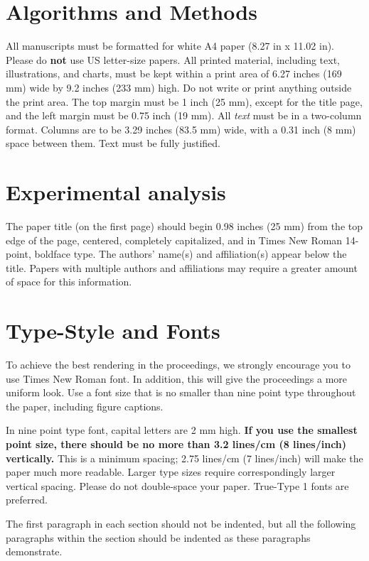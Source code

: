 \documentclass[a4paper,10pt,oneside]{article}
\begin{document}
\begin{sloppy}
\section{ Algorithms and Methods }
\label{sec:format}

All manuscripts must be formatted for white A4 paper (8.27 in x 11.02 in). Please do \textbf{not} use US letter-size papers. All printed material, including text, illustrations, and charts, must be kept within a print area of 6.27 inches (169 mm) wide by 9.2 inches (233 mm) high. Do not write or print anything outside the print area. The top margin must be 1 inch (25 mm), except for the title page, and the left margin must be 0.75 inch (19 mm). All \textit{text} must be in a two-column format. Columns are to be 3.29 inches (83.5 mm) wide, with a 0.31 inch (8 mm) space between them. Text must be fully justified.

\section{ Experimental analysis }
\label{sec:pagestyle}

The paper title (on the first page) should begin 0.98 inches (25 mm) from the top edge of the page, centered, completely capitalized, and in Times New Roman 14-point, boldface type. The authors' name(s) and affiliation(s) appear below the title. Papers with multiple authors and affiliations may require a greater amount of space for this information.

\section{Type-Style and Fonts}
\label{sec:typestyle}

To achieve the best rendering in the proceedings, we strongly encourage you to use Times New Roman font. In addition, this will give the proceedings a more uniform look. Use a font size that is no smaller than nine point type throughout the paper, including figure captions.

In nine point type font, capital letters are 2 mm high. {\bf If you use the smallest point size, there should be no more than 3.2 lines/cm (8 lines/inch) vertically.} This is a minimum spacing; 2.75 lines/cm (7 lines/inch) will make the paper much more readable. Larger type sizes require correspondingly larger vertical spacing. Please do not double-space your paper. True-Type 1 fonts are preferred.

The first paragraph in each section should not be indented, but all the following paragraphs within the section should be indented as these paragraphs demonstrate.


\end{sloppy}
\end{document}
